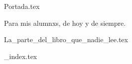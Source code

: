 {Portada.tex}

\begin{center}
  \thispagestyle{empty}
  \vspace*{\fill}
  Para mis alumnxs, de hoy y de siempre.
  \vspace*{\fill}
\end{center}
\clearpage

{La_parte_del_libro_que_nadie_lee.tex}

\tableofcontents

\mainmatter

{_index.tex}
%   
